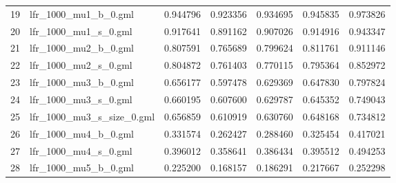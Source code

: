 \begin{tabular}{llrrrrr}
19 &        lfr\_1000\_mu1\_b\_0.gml &                          0.944796 &                             0.923356 &                            0.934695 &                           0.945835 &                        0.973826 \\
20 &        lfr\_1000\_mu1\_s\_0.gml &                          0.917641 &                             0.891162 &                            0.907026 &                           0.914916 &                        0.943347 \\
21 &        lfr\_1000\_mu2\_b\_0.gml &                          0.807591 &                             0.765689 &                            0.799624 &                           0.811761 &                        0.911146 \\
22 &        lfr\_1000\_mu2\_s\_0.gml &                          0.804872 &                             0.761403 &                            0.770115 &                           0.795364 &                        0.852972 \\
23 &        lfr\_1000\_mu3\_b\_0.gml &                          0.656177 &                             0.597478 &                            0.629369 &                           0.647830 &                        0.797824 \\
24 &        lfr\_1000\_mu3\_s\_0.gml &                          0.660195 &                             0.607600 &                            0.629787 &                           0.645352 &                        0.749043 \\
25 &   lfr\_1000\_mu3\_s\_size\_0.gml &                          0.656859 &                             0.610919 &                            0.630760 &                           0.648168 &                        0.734812 \\
26 &        lfr\_1000\_mu4\_b\_0.gml &                          0.331574 &                             0.262427 &                            0.288460 &                           0.325454 &                        0.417021 \\
27 &        lfr\_1000\_mu4\_s\_0.gml &                          0.396012 &                             0.358641 &                            0.386434 &                           0.395512 &                        0.494253 \\
28 &        lfr\_1000\_mu5\_b\_0.gml &                          0.225200 &                             0.168157 &                            0.186291 &                           0.217667 &                        0.252298 \\

\end{tabular}
